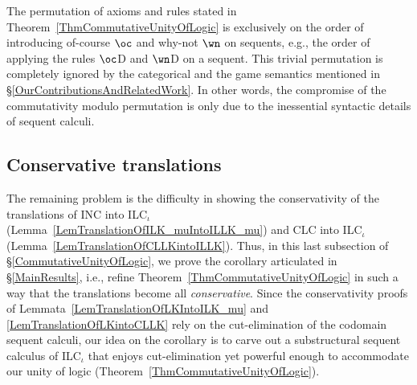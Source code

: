 \documentclass[a4paper]{article}
\theoremstyle{definition}
\theoremstyle{theorem}
\theoremstyle{remark}
\begin{document}
The permutation of axioms and rules stated in Theorem~\ref{ThmCommutativeUnityOfLogic} is exclusively on the order of introducing of-course $\oc$ and why-not $\wn$ on sequents, e.g., the order of applying the rules $\oc$D and $\wn$D on a sequent.
This trivial permutation is completely ignored by the categorical and the game semantics mentioned in \S\ref{OurContributionsAndRelatedWork}.
In other words, the compromise of the commutativity modulo permutation is only due to the inessential syntactic details of sequent calculi.









\subsection{Conservative translations}
\label{ConservativeTranslations}
The remaining problem is the difficulty in showing the conservativity of the translations of \textsf{INC} into \textsf{ILC$_\iota$} (Lemma~\ref{LemTranslationOfILK_muIntoILLK_mu}) and \textsf{CLC} into \textsf{ILC$_\iota$} (Lemma~\ref{LemTranslationOfCLLKintoILLK}).
Thus, in this last subsection of \S\ref{CommutativeUnityOfLogic}, we prove the corollary articulated in \S\ref{MainResults}, i.e., refine Theorem~\ref{ThmCommutativeUnityOfLogic} in such a way that the translations become all \emph{conservative}.
Since the conservativity proofs of Lemmata~\ref{LemTranslationOfLKIntoILK_mu} and \ref{LemTranslationOfLKintoCLLK} rely on the cut-elimination of the codomain sequent calculi, our  idea on the corollary is to carve out a substructural sequent calculus of \textsf{ILC$_\iota$} that enjoys cut-elimination yet powerful enough to accommodate our unity of logic (Theorem~\ref{ThmCommutativeUnityOfLogic}).
\end{document}
